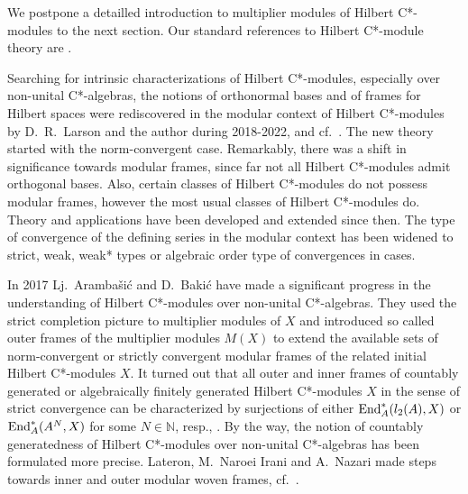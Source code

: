 \documentclass{amsart}
\theoremstyle{definition}
\begin{document}
We postpone a detailled introduction to multiplier modules of Hilbert C*-modules to the next section. Our standard references to Hilbert C*-module theory are \cite{Lance_95,RW_1998,Wegge-Olsen}.


Searching for intrinsic characterizations of Hilbert C*-modules, especially over non-unital C*-algebras, the notions of orthonormal bases and of frames for Hilbert spaces were rediscovered in the modular context of Hilbert C*-modules by D.~R.~Larson and the author during 2018-2022, \cite{FL_1999, 
FL_2000,FL_2002} and cf.~\cite{HJLM}. The new theory started with the norm-convergent case. Remarkably, there was a shift in significance towards modular frames, since far not all Hilbert C*-modules admit orthogonal bases. Also, certain classes of Hilbert C*-modules do not possess modular frames, however the most usual classes of Hilbert C*-modules do. Theory and applications have been developed and extended since then. The type of convergence of the defining series in the modular context has been widened to strict, weak, weak* types or algebraic order type of convergences in cases. 

In 2017 Lj.~Aramba{\v{s}}i\'c and D.~Baki\'c have made  a significant progress in the understanding of Hilbert C*-modules over non-unital C*-algebras. They used the strict completion picture to multiplier modules of $X$ and introduced so called outer frames of the multiplier modules $M(X)$ to extend the available sets of norm-convergent or strictly convergent modular frames of the related initial Hilbert C*-modules $X$. It turned out that all outer and inner frames of countably generated or algebraically finitely generated Hilbert C*-modules $X$ in the sense of strict convergence can be characterized by surjections of either ${\rm End}_A^*(l_2(A),X)$ or ${\rm End}_A^*(A^N,X)$ for some $N\in {\mathbb N}$, resp., \cite[Thm.~3.18, Thm.~3.19, Prop.~3.22, Prop.~3.23]{AB_2017}. By the way, the notion of countably generatedness of Hilbert C*-modules over non-unital C*-algebras has been formulated more precise. Lateron, M.~Naroei Irani and A.~Nazari made steps towards inner and outer modular woven frames, cf.~\cite{NI_N_2021}. 
\end{document}
